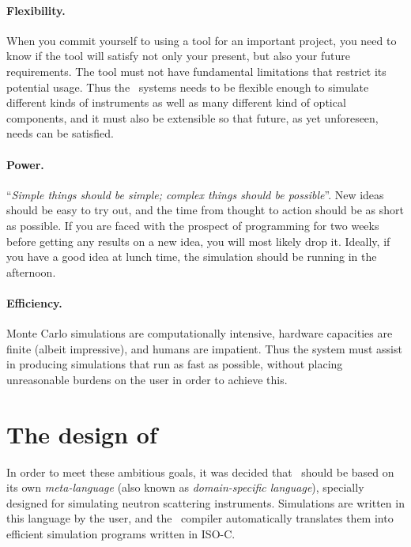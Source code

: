 \paragraph{Flexibility.}
When you commit yourself to using a tool for an important project, you
need to know if the tool will satisfy not only your present, but also
your future requirements. The tool must not have fundamental limitations that
restrict its potential usage. Thus the \MCS\ systems needs to be
flexible enough to simulate different kinds of instruments
as well as many different kind of
optical components, and it must also be extensible so that future, as
yet unforeseen, needs can be satisfied.
%
\paragraph{Power.}
``\textit{Simple things should be simple; complex things should be possible}''.
New ideas should be easy to try out, and the time from thought to action
should be as short as possible. If you are faced with the prospect of programming for
two weeks before getting any results on a new idea, you will most likely drop
it. Ideally, if you have a good idea at lunch time, the simulation
should be running in the afternoon.
%
\paragraph{Efficiency.}
Monte Carlo simulations are computationally intensive, hardware capacities
are finite (albeit impressive), and humans are impatient. Thus the
system must assist in producing simulations that run as fast as
possible, without placing unreasonable burdens on the user in order to
achieve this.


\section{The design of \MCS}
\label{s:design}

In order to meet these ambitious goals, it was decided that \MCS\ should
be based on its own \emph{meta-language} (also known as \emph{domain-specific language}), specially designed for
simulating neutron scattering instruments. Simulations are written in
this language by the user, and the \MCS\ compiler automatically
translates them into efficient simulation programs written in ISO-C.

